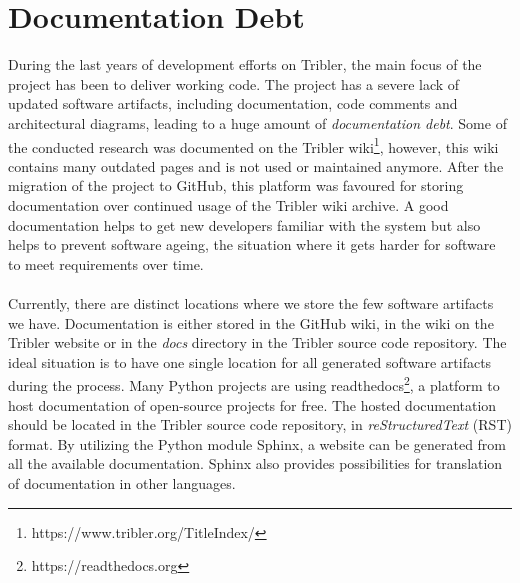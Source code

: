 
\section{Documentation Debt}
\label{sec:software-artifacts}
During the last years of development efforts on Tribler, the main focus of the project has been to deliver working code. The project has a severe lack of updated software artifacts, including documentation, code comments and architectural diagrams, leading to a huge amount of \emph{documentation debt}. Some of the conducted research was documented on the Tribler wiki\footnote{https://www.tribler.org/TitleIndex/}, however, this wiki contains many outdated pages and is not used or maintained anymore. After the migration of the project to GitHub, this platform was favoured for storing documentation over continued usage of the Tribler wiki archive. A good documentation helps to get new developers familiar with the system but also helps to prevent software ageing\cite{parnas1994software}, the situation where it gets harder for software to meet requirements over time.\\\\
Currently, there are distinct locations where we store the few software artifacts we have. Documentation is either stored in the GitHub wiki, in the wiki on the Tribler website or in the \emph{docs} directory in the Tribler source code repository. The ideal situation is to have one single location for all generated software artifacts during the process. Many Python projects are using readthedocs\footnote{https://readthedocs.org}, a platform to host documentation of open-source projects for free. The hosted documentation should be located in the Tribler source code repository, in \emph{reStructuredText} (RST) format. By utilizing the Python module Sphinx, a website can be generated from all the available documentation. Sphinx also provides possibilities for translation of documentation in other languages.\\

